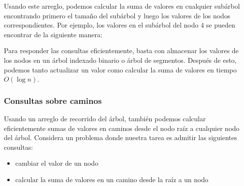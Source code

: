 Usando este arreglo, podemos calcular la suma de valores
en cualquier subárbol encontrando primero el tamaño del subárbol
y luego los valores de los nodos correspondientes.
Por ejemplo, los valores en el subárbol del nodo $4$
se pueden encontrar de la siguiente manera:

\begin{center}
\end{center}

Para responder las consultas eficientemente,
basta con almacenar los valores de los
nodos en un árbol indexado binario o árbol de segmentos.
Después de esto, podemos tanto actualizar un valor
como calcular la suma de valores en tiempo $O(\log n)$.

\subsubsection{Consultas sobre caminos}

Usando un arreglo de recorrido del árbol, también podemos
calcular eficientemente sumas de valores en
caminos desde el nodo raíz a cualquier
nodo del árbol.
Considera un problema donde nuestra tarea
es admitir las siguientes consultas:
\begin{itemize}
\item cambiar el valor de un nodo
\item calcular la suma de valores en un camino desde
la raíz a un nodo
\end{itemize}

